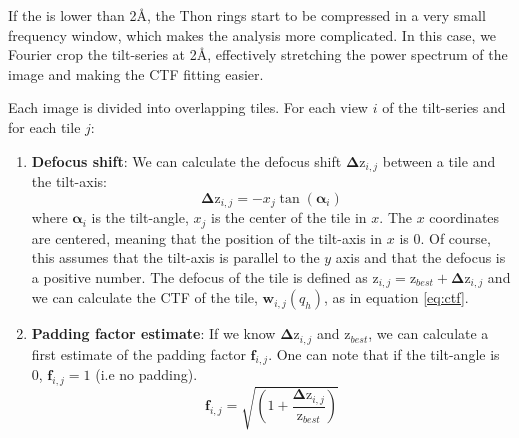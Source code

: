 \begin{note}If the  is lower than 2\r{A}, the Thon rings start to be compressed in a very small frequency window, which makes the analysis more complicated. In this case, we Fourier crop the tilt-series at 2\r{A}, effectively stretching the power spectrum of the image and making the CTF fitting easier.
\end{note}


Each image is divided into overlapping tiles. For each view $i$ of the tilt-series and for each tile $j$:

\begin{enumerate}
    \item \textbf{Defocus shift}: We can calculate the defocus shift $\bm{\Delta \mathrm{z}}_{i,j}$ between a tile and the tilt-axis:
    \begin{equation}
        \bm{\Delta \mathrm{z}}_{i,j} = -x_{j}\tan(\bm{\alpha}_i)
    \end{equation}
    where $\bm{\alpha}_i$ is the tilt-angle, $x_{j}$ is the center of the tile in $x$. The $x$ coordinates are centered, meaning that the position of the tilt-axis in $x$ is 0. Of course, this assumes that the tilt-axis is parallel to the $y$ axis and that the defocus is a positive number. The defocus of the tile is defined as $\bm{\mathrm{z}}_{i,j} = \bm{\mathrm{z}}_{best} + \bm{\Delta \mathrm{z}}_{i,j}$ and we can calculate the CTF of the tile, $\bm{w}_{i,j}(q_h)$, as in equation \ref{eq:ctf}.

    \item \textbf{Padding factor estimate}: If we know $\bm{\Delta \mathrm{z}}_{i,j}$ and $\bm{\mathrm{z}}_{best}$, we can calculate a first estimate of the padding factor $\bm{f}_{i,j}$. One can note that if the tilt-angle is 0\textdegree, $\bm{f}_{i,j} = 1$ (i.e no padding).
    \begin{equation}
        \bm{f}_{i,j} = \sqrt{ \left( 1 + \frac{ \bm{\Delta \mathrm{z}}_{i,j} }{ \bm{ \mathrm{z}}_{best} } \right) }
    \end{equation}


\end{enumerate}
